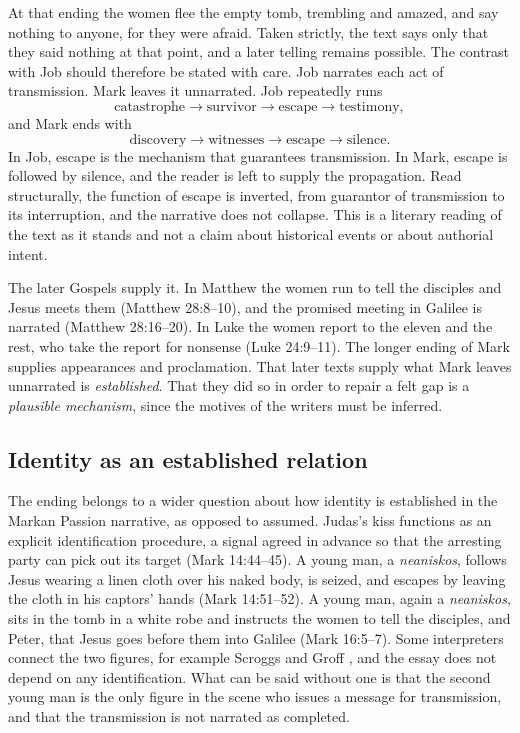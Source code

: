 \documentclass[11pt]{article}
\begin{document}
At that ending the women flee the empty tomb, trembling and amazed, and say nothing to anyone, for they were afraid. Taken strictly, the text says only that they said nothing at that point, and a later telling remains possible. The contrast with Job should therefore be stated with care. Job narrates each act of transmission. Mark leaves it unnarrated. Job repeatedly runs
\begin{equation*}
\text{catastrophe} \rightarrow \text{survivor} \rightarrow \text{escape} \rightarrow \text{testimony},
\end{equation*}
and Mark ends with
\begin{equation*}
\text{discovery} \rightarrow \text{witnesses} \rightarrow \text{escape} \rightarrow \text{silence}.
\end{equation*}
In Job, escape is the mechanism that guarantees transmission. In Mark, escape is followed by silence, and the reader is left to supply the propagation. Read structurally, the function of escape is inverted, from guarantor of transmission to its interruption, and the narrative does not collapse. This is a literary reading of the text as it stands and not a claim about historical events or about authorial intent.

The later Gospels supply it. In Matthew the women run to tell the disciples and Jesus meets them (Matthew 28:8--10), and the promised meeting in Galilee is narrated (Matthew 28:16--20). In Luke the women report to the eleven and the rest, who take the report for nonsense (Luke 24:9--11). The longer ending of Mark supplies appearances and proclamation. That later texts supply what Mark leaves unnarrated is \emph{established}. That they did so in order to repair a felt gap is a \emph{plausible mechanism}, since the motives of the writers must be inferred.

\subsection{Identity as an established relation}

The ending belongs to a wider question about how identity is established in the Markan Passion narrative, as opposed to assumed. Judas's kiss functions as an explicit identification procedure, a signal agreed in advance so that the arresting party can pick out its target (Mark 14:44--45). A young man, a \emph{neaniskos}, follows Jesus wearing a linen cloth over his naked body, is seized, and escapes by leaving the cloth in his captors' hands (Mark 14:51--52). A young man, again a \emph{neaniskos}, sits in the tomb in a white robe and instructs the women to tell the disciples, and Peter, that Jesus goes before them into Galilee (Mark 16:5--7). Some interpreters connect the two figures, for example Scroggs and Groff \cite{scroggs}, and the essay does not depend on any identification. What can be said without one is that the second young man is the only figure in the scene who issues a message for transmission, and that the transmission is not narrated as completed.
\end{document}
